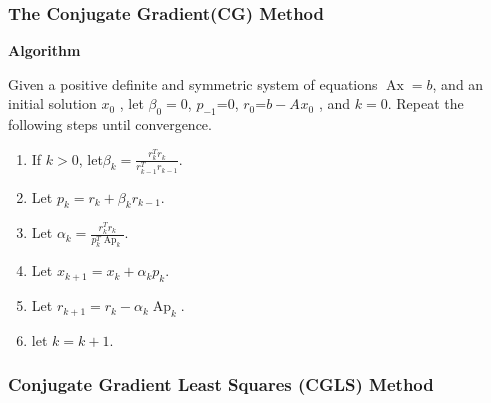 \documentclass[a4paper]{article}
\newcommand{\tmop}[1]{\ensuremath{\operatorname{#1}}}
\newcommand{\tmtextbf}[1]{{\bfseries{#1}}}
\newcommand{\tmtextup}[1]{{\upshape{#1}}}
\newenvironment{enumeratenumeric}{\begin{enumerate}[1.] }{\end{enumerate}}
\newenvironment{tmindent}{\begin{tmparmod}{1.5em}{0pt}{0pt} }{\end{tmparmod}}
\newenvironment{tmparmod}[3]{\begin{list}{}{\setlength{\topsep}{0pt}\setlength{\leftmargin}{#1}\setlength{\rightmargin}{#2}\setlength{\parindent}{#3}\setlength{\listparindent}{\parindent}\setlength{\itemindent}{\parindent}\setlength{\parsep}{\parskip}} \item[]}{\end{list}}
\newenvironment{tmparsep}[1]{\begingroup\setlength{\parskip}{#1}}{\endgroup}
\begin{document}
\subsubsection{The Conjugate Gradient(CG) Method}

{\noindent}\begin{tmparsep}{0em}
  \tmtextbf{Algorithm \tmtextup{4}}{\smallskip}
  \begin{tmindent}
    Given a positive definite and symmetric system of equations $\tmop{Ax} =
    b$, and an initial solution $x_0$ , let $\beta_0 = 0$, $p_{- 1}$=0,
    $r_0$=$b - A_{} x_0$ , and $k = 0$. Repeat the following steps until
    convergence.
    \begin{enumeratenumeric}
      \item If $k > 0$, let$\beta_k = \frac{r_k^T r_k}{r_{k - 1}^T r_{k - 1}}
      .$

      \item Let $p_k = r_k + \beta_k r_{k - 1} .$

      \item Let $\alpha_k = \frac{r_k^T r_k}{p_k^T \tmop{Ap}_k} .$

      \item Let $x_{k + 1} = x_k + \alpha_k p_k .$

      \item Let $r_{k + 1} = r_k - \alpha_k \tmop{Ap}_k$.

      \item let $k = k + 1$.


    \end{enumeratenumeric}
  \end{tmindent}
\end{tmparsep}{\hspace*{\fill}}{\medskip}

\subsubsection{Conjugate Gradient Least Squares (CGLS) Method}
\end{document}
